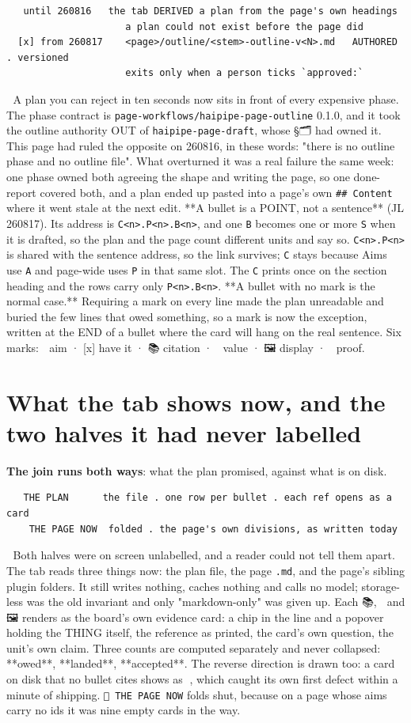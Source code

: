 \begin{verbatim}
   until 260816   the tab DERIVED a plan from the page's own headings
                     a plan could not exist before the page did
  [x] from 260817    <page>/outline/<stem>-outline-v<N>.md   AUTHORED . versioned
                     exits only when a person ticks `approved:`
\end{verbatim}
📌 A plan you can reject in ten seconds now sits in front of every expensive phase. The phase contract is \texttt{page-workflows/haipipe-page-outline} 0.1.0, and it took the outline authority OUT of \texttt{haipipe-page-draft}, whose §🗂 had owned it. This page had ruled the opposite on 260816, in these words: "there is no outline phase and no outline file". What overturned it was a real failure the same week: one phase owned both agreeing the shape and writing the page, so one done-report covered both, and a plan ended up pasted into a page's own \texttt{\#\# Content} where it went stale at the next edit. **A bullet is a POINT, not a sentence** (JL 260817). Its address is \texttt{C<n>.P<n>.B<n>}, and one \texttt{B} becomes one or more \texttt{S} when it is drafted, so the plan and the page count different units and say so. \texttt{C<n>.P<n>} is shared with the sentence address, so the link survives; \texttt{C} stays because Aims use \texttt{A} and page-wide uses \texttt{P} in that same slot. The \texttt{C} prints once on the section heading and the rows carry only \texttt{P<n>.B<n>}. **A bullet with no mark is the normal case.** Requiring a mark on every line made the plan unreadable and buried the few lines that owed something, so a mark is now the exception, written at the END of a bullet where the card will hang on the real sentence. Six marks: 🎯 aim · [x] have it · 📚 citation · 🔢 value · 🖼 display · 🧮 proof.


\section{What the tab shows now, and the two halves it had never labelled}
\textbf{The join runs both ways}: what the plan promised, against what is on disk.

\begin{verbatim}
   THE PLAN      the file . one row per bullet . each ref opens as a card
    THE PAGE NOW  folded . the page's own divisions, as written today
\end{verbatim}
📌 Both halves were on screen unlabelled, and a reader could not tell them apart. The tab reads three things now: the plan file, the page \texttt{.md}, and the page's sibling plugin folders. It still writes nothing, caches nothing and calls no model; storage-less was the old invariant and only "markdown-only" was given up. Each 📚, 🔢 and 🖼 renders as the board's own evidence card: a chip in the line and a popover holding the THING itself, the reference as printed, the card's own question, the unit's own claim. Three counts are computed separately and never collapsed: **owed**, **landed**, **accepted**. The reverse direction is drawn too: a card on disk that no bullet cites shows as 🎈, which caught its own first defect within a minute of shipping. \texttt{📄 THE PAGE NOW} folds shut, because on a page whose aims carry no ids it was nine empty cards in the way.

